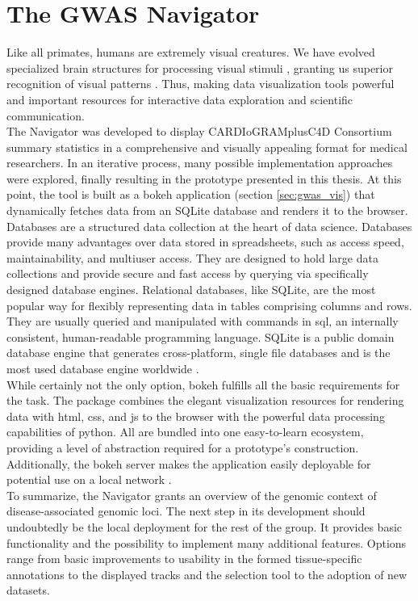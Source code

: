 \section{The GWAS Navigator}
Like all primates, humans are extremely visual creatures. We have evolved specialized brain structures for processing visual stimuli \cite{kaasCurrentResearchOrganization2014}, granting us superior recognition of visual patterns \cite{mattsonSuperiorPatternProcessing2014}. Thus, making data visualization tools powerful and important resources for interactive data exploration and scientific communication.\\
The  Navigator was developed to display CARDIoGRAMplusC4D Consortium \cite{aragamDiscoverySystematicCharacterization2021s} summary statistics in a comprehensive and visually appealing format for medical researchers. In an iterative process, many possible implementation approaches were explored, finally resulting in the prototype presented in this thesis. At this point, the tool is built as a bokeh application (section \ref{sec:gwas_vis}) that dynamically fetches data from an SQLite database and renders it to the browser.\\
Databases are a structured data collection at the heart of data science. Databases provide many advantages over data stored in spreadsheets, such as access speed, maintainability, and multiuser access. They are designed to hold large data collections and provide secure and fast access by querying via specifically designed database engines. Relational databases, like SQLite, are the most popular way for flexibly representing data in tables comprising columns and rows. They are usually queried and manipulated with commands in \ac{sql}, an internally consistent, human-readable programming language. \cite{oraclecorporationWhatDatabase2022, oraclecorporationWhatRelationalDatabase2022} SQLite is a public domain database engine that generates cross-platform, single file databases and is the most used database engine worldwide \cite{thesqliteconsortiumSQLite2022}.\\
While certainly not the only option, bokeh fulfills all the basic requirements for the task. The package combines the elegant visualization resources for rendering data with \ac{html}, \ac{css}, and \ac{js} to the browser with the powerful data processing capabilities of python. All are bundled into one easy-to-learn ecosystem, providing a level of abstraction required for a prototype's construction. Additionally, the bokeh server makes the application easily deployable for potential use on a local network \cite{bokehdevelopmentteamBokehPythonLibrary2022}. \\
To summarize, the  Navigator grants an overview of the genomic context of disease-associated genomic loci. The next step in its development should undoubtedly be the local deployment for the rest of the group. It provides basic functionality and the possibility to implement many additional features. Options range from basic improvements to usability in the formed tissue-specific annotations to the displayed tracks and the selection tool to the adoption of new datasets.


